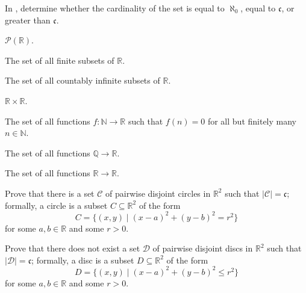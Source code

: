 In , determine whether the cardinality of the set is equal to $\aleph_0$, equal to $\mathfrak{c}$, or greater than $\mathfrak{c}$.

\begin{chapex}
\label{cqFindCardinalityBegin}
$\mathcal{P}(\mathbb{R})$.
\end{chapex}

\begin{chapex}
The set of all finite subsets of $\mathbb{R}$.
\end{chapex}

\begin{chapex}
The set of all countably infinite subsets of $\mathbb{R}$.
\end{chapex}

\begin{chapex}
$\mathbb{R} \times \mathbb{R}$.
\end{chapex}

\begin{chapex}
The set of all functions $f : \mathbb{N} \to \mathbb{R}$ such that $f(n) = 0$ for all but finitely many $n \in \mathbb{N}$.
\end{chapex}

\begin{chapex}
The set of all functions $\mathbb{Q} \to \mathbb{R}$.
\end{chapex}

\begin{chapex}
\label{cqFindCardinalityEnd}
The set of all functions $\mathbb{R} \to \mathbb{R}$.
\end{chapex}

\begin{chapex}
Prove that there is a set $\mathcal{C}$ of pairwise disjoint circles in $\mathbb{R}^2$ such that $|\mathcal{C}| = \mathfrak{c}$; formally, a circle is a subset $C \subseteq \mathbb{R}^2$ of the form
\[ C = \{ (x,y) \mid (x-a)^2 + (y-b)^2 = r^2 \} \]
for some $a,b \in \mathbb{R}$ and some $r > 0$.
\end{chapex}

\begin{chapex}
Prove that there does not exist a set $\mathcal{D}$ of pairwise disjoint discs in $\mathbb{R}^2$ such that $|\mathcal{D}| = \mathfrak{c}$; formally, a disc is a subset $D \subseteq \mathbb{R}^2$ of the form
\[ D = \{ (x,y) \mid (x-a)^2 + (y-b)^2 \le r^2 \} \]
for some $a,b \in \mathbb{R}$ and some $r>0$.
\end{chapex}

